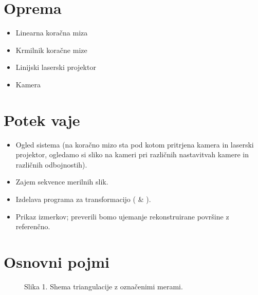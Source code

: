 \documentclass[letterpaper,10pt,english]{sphinxmanual}
\begin{document}
\section{Oprema}
\label{\detokenize{laserskiprofilomer:oprema}}\begin{itemize}
\item {} 
\sphinxAtStartPar
Linearna koračna miza

\item {} 
\sphinxAtStartPar
Krmilnik koračne mize

\item {} 
\sphinxAtStartPar
Linijski laserski projektor

\item {} 
\sphinxAtStartPar
Kamera

\end{itemize}


\section{Potek vaje}
\label{\detokenize{laserskiprofilomer:potek-vaje}}\begin{itemize}
\item {} 
\sphinxAtStartPar
Ogled sistema (na koračno mizo sta pod kotom pritrjena kamera in laserski projektor, ogledamo si sliko na kameri pri različnih nastavitvah kamere in različnih odbojnostih).

\item {} 
\sphinxAtStartPar
Zajem sekvence merilnih slik.

\item {} 
\sphinxAtStartPar
Izdelava programa za transformacijo (  \&  ).

\item {} 
\sphinxAtStartPar
Prikaz izmerkov; preverili bomo ujemanje rekonstruirane površine z referenčno.

\end{itemize}


\section{Osnovni pojmi}
\label{\detokenize{laserskiprofilomer:osnovni-pojmi}}
\begin{figure}[htbp]
\centering
\capstart

\noindent{}
\caption{Slika 1. Shema triangulacije z označenimi merami.}\label{\detokenize{laserskiprofilomer:id1}}\end{figure}
\end{document}
